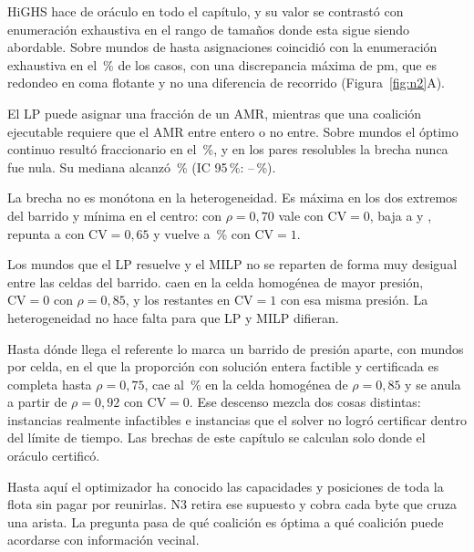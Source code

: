 \documentclass[12pt,a4paper]{article}
\theoremstyle{remark}
\theoremstyle{plain}
\begin{document}
HiGHS \citep{huangfuHall2018Highs} hace de oráculo en todo el capítulo, y su
valor se contrastó con enumeración exhaustiva en el rango de tamaños donde esta
sigue siendo abordable. Sobre \NTwoOracleRows{} mundos de
hasta \NTwoOracleMaxStates{} asignaciones coincidió con la enumeración exhaustiva
en el \NTwoOracleAgreementPct\,\% de los casos, con
una discrepancia máxima de \NTwoOracleMaxErrorPm{} pm, que es redondeo en coma
flotante y no una diferencia de recorrido (Figura~\ref{fig:n2}A).

El LP puede asignar una fracción de un AMR, mientras que una coalición ejecutable
requiere que el AMR entre entero o no entre. Sobre \NTwoAtomicityRows{} mundos el
óptimo continuo
resultó fraccionario en el \NTwoFractionalAllPct\,\%, y en los
\NTwoAtomicityComparable{} pares resolubles la brecha nunca fue nula. Su mediana
alcanzó \NTwoGapPct\,\% (IC 95\,\%:
\NTwoGapLowPct--\NTwoGapHighPct\,\%).

La brecha no es monótona en la heterogeneidad. Es máxima en los dos extremos del
barrido y mínima en el centro: con $\rho=0{,}70$ vale \NTwoGapCvZeroRho{} con
$\mathrm{CV}=0$, baja a \NTwoGapCvLowRho{} y \NTwoGapCvMidRho, repunta a
\NTwoGapCvHighRho{} con $\mathrm{CV}=0{,}65$ y vuelve a \NTwoGapCvOneRho\,\% con
$\mathrm{CV}=1$.

Los \NTwoLpOnlyCount{} mundos que el LP resuelve y el MILP no se reparten de forma
muy desigual entre las celdas del barrido. \NTwoLpOnlyTopN{} caen en la celda homogénea de mayor presión,
$\mathrm{CV}=0$ con $\rho=0{,}85$, y los \NTwoLpOnlyRestN{} restantes en
$\mathrm{CV}=1$ con esa misma presión. La heterogeneidad no hace falta para que LP
y MILP difieran.

Hasta dónde llega el referente lo marca un barrido de presión aparte, con
\NOneWorldsPerCell{} mundos por celda, en el que la proporción con solución entera
factible y certificada es completa hasta $\rho=0{,}75$, cae al
\NTwoCertHomogeneousHighRho\,\% en la celda homogénea de $\rho=0{,}85$ y se anula
a partir de $\rho=0{,}92$ con $\mathrm{CV}=0$. Ese descenso mezcla dos cosas
distintas: instancias realmente infactibles e instancias que el solver no logró
certificar dentro del límite de tiempo. Las brechas de este capítulo se calculan
solo donde el oráculo certificó.

Hasta aquí el optimizador ha conocido las capacidades y posiciones de toda la
flota sin pagar por reunirlas. N3 retira ese supuesto y cobra cada byte que cruza
una arista. La pregunta pasa de qué coalición es óptima a qué coalición puede
acordarse con información vecinal.
\end{document}
